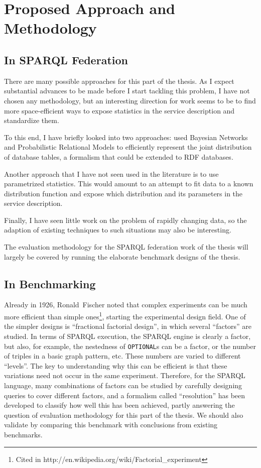 \documentclass{llncs}
\begin{document}
\section{Proposed Approach and Methodology}

\subsection{In SPARQL Federation}

There are many possible approaches for this part of the thesis. As I
expect substantial advances to be made before I start tackling this
problem, I have not chosen any methodology, but an interesting
direction for work seems to be to find more space-efficient ways to
expose statistics in the service description and standardize them.

To this end, I have briefly looked into two approaches:
\cite{Getoor:2001:SEU:375663.375727} used Bayesian Networks and
Probabilistic Relational Models to efficiently represent the joint
distribution of database tables, a formalism that could be extended to
RDF databases.

Another approach that I have not seen used in the literature is to use
parametrized statistics. This would amount to an attempt to fit data to
a known distribution function and expose which distribution and its
parameters in the service description.

Finally, I have seen little work on the problem of rapidly changing
data, so the adaption of existing techniques to such situations may
also be interesting.

The evaluation methodology for the SPARQL federation work of the
thesis will largely be covered by running the elaborate benchmark
designs of the thesis.

\subsection{In Benchmarking}\label{sec:benchmethod}

Already in 1926, Ronald~Fischer noted that complex experiments can be
much more efficient than simple ones\footnote{Cited in
  http://en.wikipedia.org/wiki/Factorial\_experiment}, starting the
experimental design field. One of the simpler designs is ``fractional
factorial design'', in which several ``factors'' are studied. In terms
of SPARQL execution, the SPARQL engine is clearly a factor, but also,
for example, the nestedness of \texttt{OPTIONAL}s can be a factor, or
the number of triples in a basic graph pattern, etc. These numbers are
varied to different ``levels''. The key to understanding why this can
be efficient is that these variations need not occur in the same
experiment. Therefore, for the SPARQL language, many combinations of
factors can be studied by carefully designing queries to cover
different factors, and a formalism called ``resolution'' has been
developed to classify how well this has been achieved, partly
answering the question of evaluation methodology for this part of the
thesis. We should also validate by comparing this benchmark with
conclusions from existing benchmarks.
\end{document}
